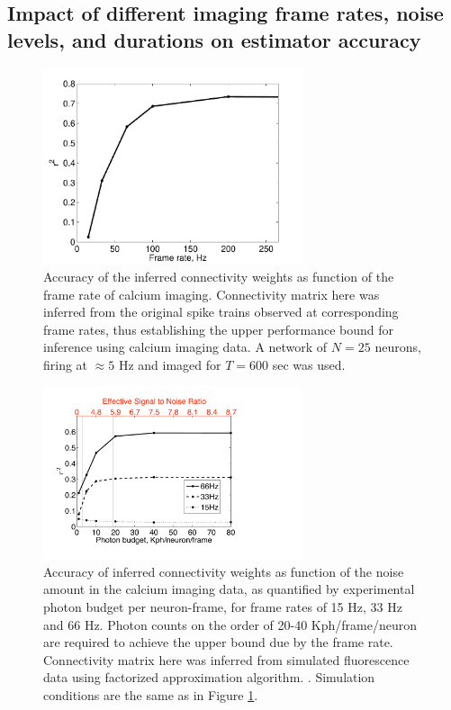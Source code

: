 \subsection{Impact of different imaging frame rates, noise levels, and durations on estimator accuracy}

\begin{figure}[h]
\centering
\includegraphics[width=3in]{../figs/FigureA5_recvar}
\caption{Accuracy of the inferred connectivity weights as function of the frame rate of calcium imaging. Connectivity matrix here was inferred from the original spike trains observed at corresponding frame rates, thus establishing the upper performance bound for inference using calcium imaging data. A network of $N=25$ neurons, firing at $\approx 5$ Hz and imaged for $T=600$ sec was used.}
\label{fig:recvar}
\end{figure}

\begin{figure}[h]
\centering
\includegraphics[width=3in]{../figs/FigureA6_recvar_SNR}
\caption{Accuracy of inferred connectivity weights as function of the noise amount in the calcium imaging data, as quantified by experimental photon budget per neuron-frame, for frame rates of 15 Hz, 33 Hz and 66 Hz. Photon counts on the order of 20-40 Kph/frame/neuron are required to achieve the upper bound due by the frame rate. Connectivity matrix here was inferred from simulated fluorescence data using factorized approximation algorithm. . Simulation conditions are the same as in Figure \ref{fig:recvar}.}
\label{fig:recvar-SNR}
\end{figure}

